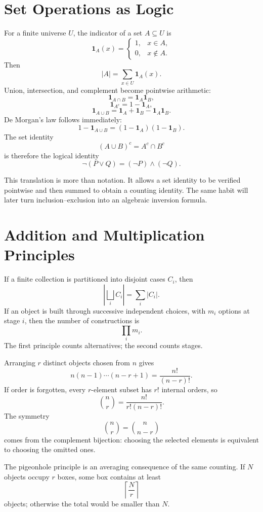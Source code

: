 
\section{Set Operations as Logic}

For a finite universe \(U\), the indicator of a set \(A\subseteq U\) is
\[
  \mathbf1_A(x)=
  \begin{cases}
    1,&x\in A,\\
    0,&x\notin A.
  \end{cases}
\]
Then
\[
  |A|=\sum_{x\in U}\mathbf1_A(x).
\]
Union, intersection, and complement become pointwise arithmetic:
\[
  \mathbf1_{A\cap B}=\mathbf1_A\mathbf1_B,
\]
\[
  \mathbf1_{A^c}=1-\mathbf1_A,
\]
\[
  \mathbf1_{A\cup B}
  =\mathbf1_A+\mathbf1_B-\mathbf1_A\mathbf1_B.
\]
De Morgan's law follows immediately:
\[
  1-\mathbf1_{A\cup B}
  =(1-\mathbf1_A)(1-\mathbf1_B).
\]
The set identity
\[
  (A\cup B)^c=A^c\cap B^c
\]
is therefore the logical identity
\[
  \neg(P\lor Q)=(\neg P)\land(\neg Q).
\]

This translation is more than notation.  It allows a set identity to be verified pointwise and then summed to obtain a counting identity.  The same habit will later turn inclusion--exclusion into an algebraic inversion formula.

\section{Addition and Multiplication Principles}

If a finite collection is partitioned into disjoint cases \(C_i\), then
\[
  \left|\bigsqcup_i C_i\right|
  =\sum_i|C_i|.
\]
If an object is built through successive independent choices, with \(m_i\) options at stage \(i\), then the number of constructions is
\[
  \prod_i m_i.
\]
The first principle counts alternatives; the second counts stages.

Arranging \(r\) distinct objects chosen from \(n\) gives
\[
  n(n-1)\cdots(n-r+1)
  =\frac{n!}{(n-r)!}.
\]
If order is forgotten, every \(r\)-element subset has \(r!\) internal orders, so
\[
  \binom nr
  =\frac{n!}{r!(n-r)!}.
\]
The symmetry
\[
  \binom nr=\binom n{n-r}
\]
comes from the complement bijection: choosing the selected elements is equivalent to choosing the omitted ones.

The pigeonhole principle is an averaging consequence of the same counting.  If \(N\) objects occupy \(r\) boxes, some box contains at least
\[
  \left\lceil\frac Nr\right\rceil
\]
objects; otherwise the total would be smaller than \(N\).

